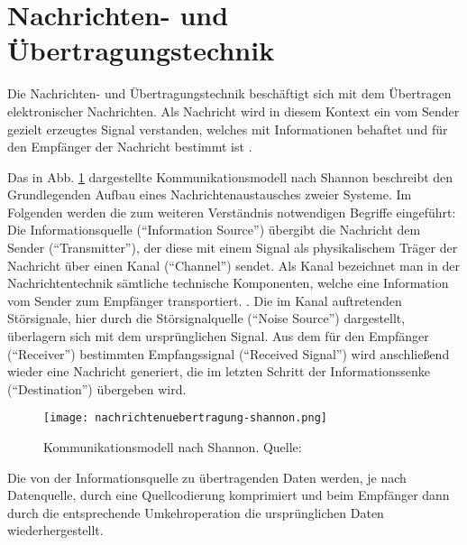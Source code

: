 \newpage
\section{Nachrichten- und Übertragungstechnik}
Die Nachrichten- und Übertragungstechnik beschäftigt sich mit dem Übertragen elektronischer Nachrichten. Als Nachricht wird in diesem Kontext ein vom Sender gezielt erzeugtes Signal verstanden, welches mit Informationen behaftet und für den Empfänger der Nachricht bestimmt ist \cite[vgl. Werner, S. 3]{Werner:2006}.

Das in Abb. \ref{nachrichtenuebertragung} dargestellte Kommunikationsmodell nach Shannon beschreibt den Grundlegenden Aufbau eines Nachrichtenaustausches zweier Systeme. 
Im Folgenden werden die zum weiteren Verständnis notwendigen Begriffe eingeführt:\newline
Die Informationsquelle (\enquote{Information Source}) übergibt die Nachricht dem Sender (\enquote{Transmitter}), der diese mit einem Signal als physikalischem Träger der Nachricht über einen Kanal (\enquote{Channel}) sendet. \newline
Als Kanal bezeichnet man in der Nachrichtentechnik sämtliche technische Komponenten, welche eine Information vom Sender zum Empfänger transportiert. \cite[vgl. Dankmeier, S. 13]{Dankmeier:2017}.\newline
Die im Kanal auftretenden Störsignale, hier durch die Störsignalquelle (\enquote{Noise Source}) dargestellt, überlagern sich mit dem ursprünglichen Signal.\newline
Aus dem für den Empfänger (\enquote{Receiver}) bestimmten Empfangssignal (\enquote{Received Signal}) wird anschließend wieder eine Nachricht generiert, die im letzten Schritt der Informationssenke (\enquote{Destination}) übergeben wird.

\begin{figure}[ht]
	\centering
	\texttt{[image: nachrichtenuebertragung-shannon.png]}
	\caption[Kommunikationsmodell nach Shannon]{Kommunikationsmodell nach Shannon. Quelle: \cite[Werner, S. 11f]{Werner:2017}} 
	\label{nachrichtenuebertragung}
\end{figure}

Die von der Informationsquelle zu übertragenden Daten werden, je nach Datenquelle, durch eine Quellcodierung komprimiert und beim Empfänger dann durch die entsprechende Umkehroperation die ursprünglichen Daten wiederhergestellt.









